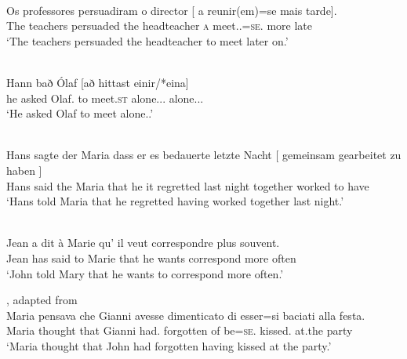 \documentclass[output=paper]{langsci/langscibook}
\begin{document}
\ea\label{ex:key:24.3}  \parencite[34]{Sheehan2018b}\\
    \sn
	\gll Os professores   persuadiram   o director  [ a    reunir(em)=se     mais tarde].\\
    The teachers   persuaded   the headteacher {} \textsc{a} meet.\Inf{}.\Tpl=\textsc{se}.\Third{}   more late\\
	\glt ‘The teachers persuaded the headteacher to meet later on.’
\z

\ea\label{ex:key:24.4}  \parencite[149]{Sheehan2018b}\\
    \sn
	\gll Hann bað    Ólaf     [að   hittast     einir/*eina]\\
he      asked Olaf.\Acc{}    to  meet.\textsc{st}   alone.\Nom.\M.\Pl{} alone.\Acc.\M.\Pl{}\\
	\glt ‘He asked Olaf to meet alone.\Pl{}.’
\z

\ea\label{ex:key:24.5}  \parencite[45]{Landau2000}\\
    \sn
	\gll Hans sagte der Maria dass er  es   bedauerte   letzte Nacht [ gemeinsam   gearbeitet   zu haben ]\\
    Hans said   the Maria that    he it   regretted   last night {} together     worked   to have\\
	\glt ‘Hans told Maria that he regretted having worked together last night.’
\z

\ea\label{ex:key:24.6}  \parencite[85]{Landau2000}\\
    \sn
	\gll Jean a    dit      à Marie  qu’   il  veut    correspondre plus  souvent.\\
		Jean has said   to Marie that he wants correspond    more often\\
	\glt ‘John told Mary that he wants to correspond more often.’
\z

\ea\label{ex:key:24.7} , adapted from \parencite[46]{Landau2000}\\
    \sn
	\gll Maria pensava che Gianni avesse dimenticato di esser=si baciati alla festa.\\
		Maria thought that Gianni had.\Sbjv{} forgotten of be=\textsc{se}.\Third{} kissed.\Pl{} at.the party\\
	\glt ‘Maria thought that John had forgotten having kissed at the party.’
\z
\end{document}
